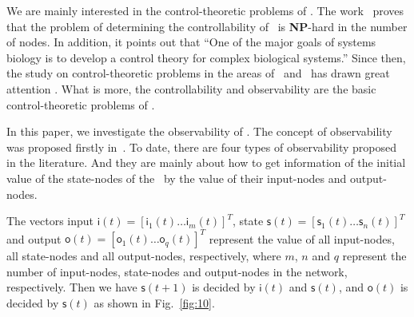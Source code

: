 We are mainly interested in the control-theoretic problems of \BCNs. The work~\cite{Akutsu2007Control} proves that the problem of determining the controllability of \BCNs\ is {\bf NP}-hard in the number of nodes. In addition, it points out that ``One of the major goals of systems biology is to develop a control theory for complex biological systems.'' Since then, the study on control-theoretic problems in the areas of \BNs\ and \BCNs\ has drawn great attention \cite{cheng2009controllability, Zhao2010Input, Cheng2011Identification, Cheng2011Analysis,Fornasini2013Observability}. What is more, the controllability and observability are the basic control-theoretic problems of \BCNs. %

In this paper, we investigate the observability of \BCNs. The concept of observability was proposed firstly in~\cite{cheng2009controllability}. To date, there are four types of observability proposed in the literature. And they are mainly about how to get  information of the initial value of the state-nodes of the \BCNs\ by the value of their input-nodes and output-nodes. 

The vectors input $\mathsf{i}(t)=[\mathsf{i}_1(t)\ldots\mathsf{i}_m(t)]^T$, state $\mathsf{s}(t)=[\mathsf{s}_1(t) \ldots \mathsf{s}_n(t)]^T$ and output $\mathsf{o}(t)=[\mathsf{o}_1(t) \ldots \mathsf{o}_q(t)]^T$ represent the value of all input-nodes, all state-nodes and all output-nodes, respectively, where $m$, $n$ and $q$ represent the number of input-nodes, state-nodes and output-nodes in the network, respectively. 
 Then we have $\mathsf{s}(t+1)$ is decided by $\mathsf{i}(t)$ and $\mathsf{s}(t)$, and $\mathsf{o}(t)$ is decided by $\mathsf{s}(t)$ as shown in Fig.~\ref{fig:10}.


